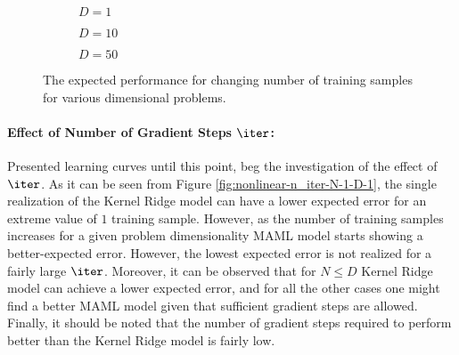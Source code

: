 \begin{figure}[!h]
  \centering
    \begin{subfigure}{0.3\textwidth}
      \centering
      \caption{$D=1$}
      \label{fig:nonlinear-N-D-1}
    \end{subfigure}
    \begin{subfigure}{0.3\textwidth}
      \centering
      \caption{$D=10$}
      \label{fig:nonlinear-N-D-10}
    \end{subfigure}
    \begin{subfigure}{0.3\textwidth}
      \centering
      \caption{$D=50$}
      \label{fig:nonlinear-N-D-50}
    \end{subfigure}
  \caption{The expected performance for changing number of training samples for various dimensional problems.}\label{ref:nonlinear-N}
\end{figure}


\paragraph{Effect of Number of Gradient Steps $\iter$:} Presented learning curves until this point, beg the investigation of the effect of $\iter$.  As it can be seen from Figure \ref{fig:nonlinear-n_iter-N-1-D-1}, the single realization of the Kernel Ridge model can have a lower expected error for an extreme value of $1$ training sample. However, as the number of training samples increases for a given problem dimensionality MAML model starts showing a better-expected error. However, the lowest expected error is not realized for a fairly large $\iter$. Moreover, it can be observed that for $N\leq D$ Kernel Ridge model can achieve a lower expected error, and for all the other cases one might find a better MAML model given that sufficient gradient steps are allowed. Finally, it should be noted that the number of gradient steps required to perform better than the Kernel Ridge model is fairly low.

